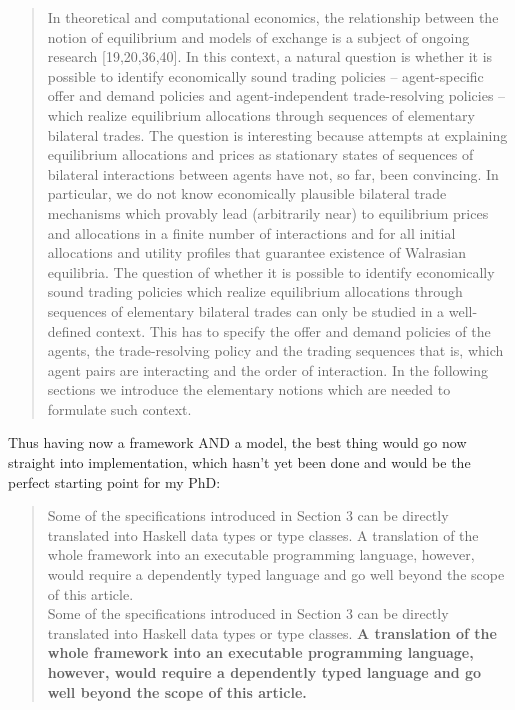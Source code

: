 \begin{quote}
In theoretical and computational economics, the relationship between the notion of equilibrium and models of exchange is a subject of ongoing research [19,20,36,40]. In this context, a natural question is whether it is possible to identify economically sound trading policies – agent-specific offer and demand policies and agent-independent trade-resolving policies – which realize equilibrium allocations through sequences of elementary bilateral trades. The question is interesting because attempts at explaining equilibrium allocations and prices as stationary states of sequences of bilateral interactions between agents have not, so far, been convincing. In particular, we do not know economically plausible bilateral trade mechanisms which provably lead (arbitrarily near) to equilibrium prices and allocations in a finite number of interactions and for all initial allocations and utility profiles that guarantee existence of Walrasian equilibria.
The question of whether it is possible to identify economically sound trading policies which realize equilibrium allocations through sequences of elementary bilateral trades can only be studied in a well-defined context. This has to specify the offer and demand policies of the agents, the trade-resolving policy and the trading sequences that is, which agent pairs are interacting and the order of interaction. In the following sections we introduce the elementary notions which are needed to formulate such context.
\end{quote}

Thus having now a framework AND a model, the best thing would go now straight into implementation, which hasn't yet been done and would be the perfect starting point for my PhD:

\begin{quote}
Some of the specifications introduced in Section 3 can be directly translated into Haskell data types or type classes. A translation of the whole framework into an executable programming language, however, would require a dependently typed language and go well beyond the scope of this article. \\
Some of the specifications introduced in Section 3 can be directly translated into Haskell data types or type classes. \textbf{A translation of the whole framework into an executable programming language, however, would require a dependently typed language and go well beyond the scope of this article.}
\end{quote}